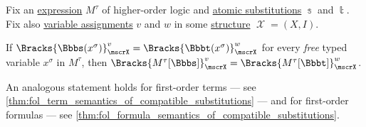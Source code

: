 \begin{proposition}\label{thm:hol_expression_semantics_of_compatible_substitutions}
  Fix an \hyperref[def:hol_expression]{expression} \( M^\tau \) of higher-order logic and \hyperref[def:atomic_lambda_term_substitution]{atomic substitutions} \( \Bbbs \) and \( \Bbbt \). Fix also \hyperref[def:hol_variable_assignment]{variable assignments} \( v \) and \( w \) in some \hyperref[def:hol_structure]{structure} \( \mscrX = (X, I) \).

  If \( \Bracks{\Bbbs(x^\sigma)}_\mscrX^v = \Bracks{\Bbbt(x^\sigma)}_\mscrX^w \) for every \emph{free} typed variable \( x^\sigma \) in \( M^\tau \), then \( \Bracks{M^\tau[\Bbbs]}_\mscrX^v = \Bracks{M^\tau[\Bbbt]}_\mscrX^w \).
\end{proposition}
\begin{comments}
  \item An analogous statement holds for first-order terms --- see \cref{thm:fol_term_semantics_of_compatible_substitutions} --- and for first-order formulas --- see \cref{thm:fol_formula_semantics_of_compatible_substitutions}.
\end{comments}
